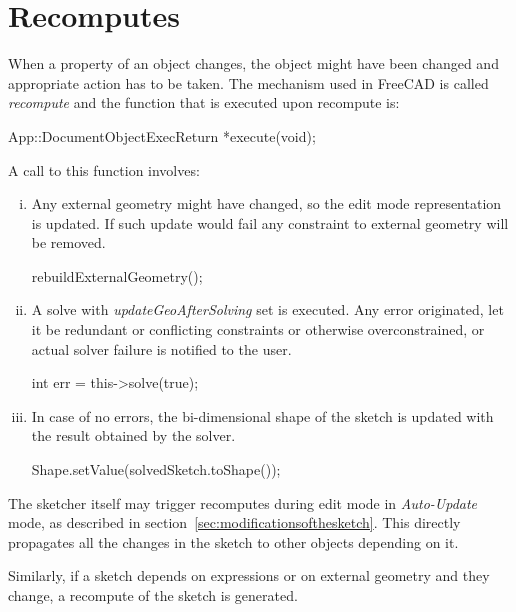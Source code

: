 \documentclass[12pt,twoside,a4paper]{book}
\begin{document}
    \section{Recomputes}

    When a property of an object changes, the object might have been changed and appropriate action has to be taken. The mechanism used in FreeCAD is called \emph{recompute} and the function that is executed upon recompute is:

    \begin{codequote}
    App::DocumentObjectExecReturn *execute(void);
    \end{codequote}

    A call to this function involves:
    \begin{enumerate}[(i)]
     \item Any external geometry might have changed, so the edit mode representation is updated. If such update would fail any constraint to external geometry will be removed.
        \begin{codequote}
        rebuildExternalGeometry();
        \end{codequote}
    \item A solve with \emph{updateGeoAfterSolving} set is executed. Any error originated, let it be redundant or conflicting constraints or otherwise overconstrained, or actual solver failure is notified to the user.
        \begin{codequote}
        int err = this-\textgreater{}solve(true);
        \end{codequote}
    \item In case of no errors, the bi-dimensional shape of the sketch is updated with the result obtained by the solver.
        \begin{codequote}
        Shape.setValue(solvedSketch.toShape());
        \end{codequote}
    \end{enumerate}

    The sketcher itself may trigger recomputes during edit mode in \emph{Auto-Update} mode, as described in section~\ref{sec:modificationsofthesketch}. This directly propagates all the changes in the sketch to other objects depending on it.

    Similarly, if a sketch depends on expressions or on external geometry and they change, a recompute of the sketch is generated.
\end{document}
